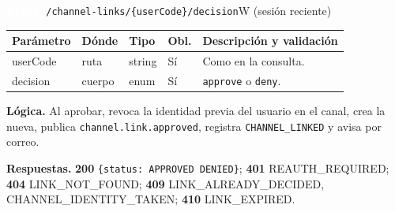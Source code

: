 \documentclass[11pt,a4paper]{report}
\newcommand{\verbo}[2]{\colorbox{#1}{\textcolor{white}{\ttfamily\bfseries\small #2}}}
\begin{document}
\begin{apiendpoint}{\verbo{verbpost}{POST}\ \texttt{/\allowbreak{}channel-links/\allowbreak{}\{userCode\}/\allowbreak{}decision}}{W (sesión reciente)}
\begin{tabularx}{\linewidth}{@{}>{\ttfamily\raggedright}p{3.0cm}p{1.35cm}p{1.9cm}p{0.9cm}X@{}}
\toprule \normalfont\bfseries Parámetro & \bfseries Dónde & \bfseries Tipo & \bfseries Obl. & \bfseries Descripción y validación\\ \midrule
userCode & ruta & string & Sí & Como en la consulta.\\
decision & cuerpo & enum & Sí & \texttt{approve} o \texttt{deny}.\\
\bottomrule\end{tabularx}
\par\smallskip\textbf{Lógica.} Al aprobar, revoca la identidad previa del usuario en el canal, crea la nueva, publica \texttt{channel.link.approved}, registra \texttt{CHANNEL\_LINKED} y avisa por correo.
\par\smallskip\textbf{Respuestas.} \textbf{200} \texttt{\{status: APPROVED \textbar{} DENIED\}}; \textbf{401} REAUTH\_REQUIRED; \textbf{404} LINK\_NOT\_FOUND; \textbf{409} LINK\_ALREADY\_DECIDED, CHANNEL\_IDENTITY\_TAKEN; \textbf{410} LINK\_EXPIRED.
\end{apiendpoint}
\end{document}
